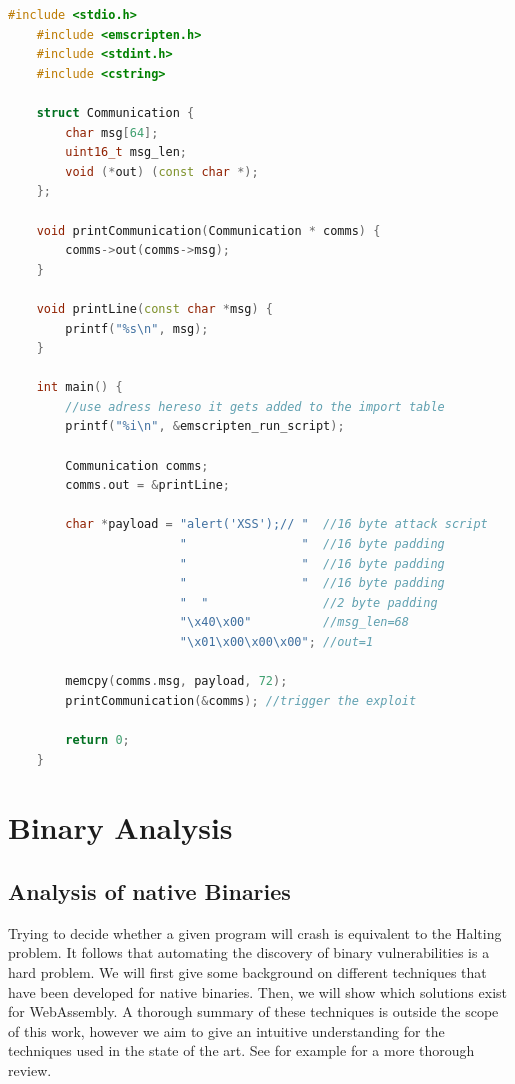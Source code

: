 \documentclass[sigconf]{acmart}
\begin{document}
\begin{lstlisting}[language=C++, label=lst:vuln_example_redirect_control_flow, caption={This code demonstrates a proof of concept of an exploit using indirect calls to influence control flow and implement cross site scripting. The payload overrides the \texttt{msg\_len} and \texttt{out} fields, redirecting control flow to implement a cross-site-scripting attack. This exploit could only work on WebAssembly and not on native binaries. Taken with modifications from \citet{mcfadden_security_2018}.}]
	#include <stdio.h>
	#include <emscripten.h>
	#include <stdint.h>
	#include <cstring>

	struct Communication {
		char msg[64];
		uint16_t msg_len;
		void (*out) (const char *);
	};

	void printCommunication(Communication * comms) {
		comms->out(comms->msg);
	}

	void printLine(const char *msg) {
		printf("%s\n", msg);
	}

	int main() {
		//use adress hereso it gets added to the import table
		printf("%i\n", &emscripten_run_script); 

		Communication comms;
		comms.out = &printLine;
		
		char *payload = "alert('XSS');// " 	//16 byte attack script
						"                " 	//16 byte padding
						"                " 	//16 byte padding
						"                " 	//16 byte padding
						"  "				//2 byte padding
						"\x40\x00"         	//msg_len=68
						"\x01\x00\x00\x00";	//out=1
						
		memcpy(comms.msg, payload, 72);
		printCommunication(&comms); //trigger the exploit
		
		return 0;
	}
\end{lstlisting}

\section{Binary Analysis}
\subsection{Analysis of native Binaries}
Trying to decide whether a given program will crash is equivalent to the Halting problem. It follows that automating the discovery of binary vulnerabilities is a hard problem. We will first give some background on different techniques that have been developed for native binaries. Then, we will show which solutions exist for WebAssembly. A thorough summary of these techniques is outside the scope of this work, however we aim to give an intuitive understanding for the techniques used in the state of the art. See for example \citet{sun_new_2018} for a more thorough review.
\end{document}

